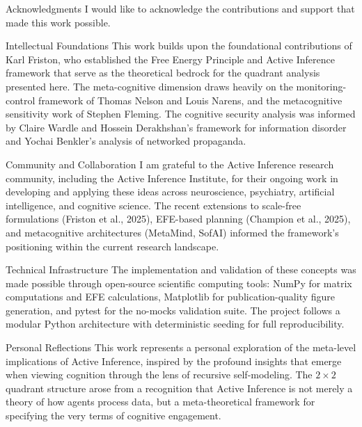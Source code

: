 \documentclass[
  ignorenonframetext,
]{beamer}
\author{\texorpdfstring{}{}}
\date{}
\begin{document}
\begin{frame}{Acknowledgments}
\protect{}\label{sec:acknowledgments}
I would like to acknowledge the contributions and support that made this
work possible.

\begin{block}{Intellectual Foundations}
\protect{}\label{intellectual-foundations}
This work builds upon the foundational contributions of Karl Friston,
who established the Free Energy Principle and Active Inference framework
that serve as the theoretical bedrock for the quadrant analysis
presented here. The meta-cognitive dimension draws heavily on the
monitoring-control framework of Thomas Nelson and Louis Narens, and the
metacognitive sensitivity work of Stephen Fleming. The cognitive
security analysis was informed by Claire Wardle and Hossein Derakhshan's
framework for information disorder and Yochai Benkler's analysis of
networked propaganda.
\end{block}

\begin{block}{Community and Collaboration}
\protect{}\label{community-and-collaboration}
I am grateful to the Active Inference research community, including the
Active Inference Institute, for their ongoing work in developing and
applying these ideas across neuroscience, psychiatry, artificial
intelligence, and cognitive science. The recent extensions to scale-free
formulations (Friston et al., 2025), EFE-based planning (Champion et
al., 2025), and metacognitive architectures (MetaMind, SofAI) informed
the framework's positioning within the current research landscape.
\end{block}

\begin{block}{Technical Infrastructure}
\protect{}\label{technical-infrastructure}
The implementation and validation of these concepts was made possible
through open-source scientific computing tools: NumPy for matrix
computations and EFE calculations, Matplotlib for publication-quality
figure generation, and pytest for the no-mocks validation suite. The
project follows a modular Python architecture with deterministic seeding
for full reproducibility.
\end{block}

\begin{block}{Personal Reflections}
\protect{}\label{personal-reflections}
This work represents a personal exploration of the meta-level
implications of Active Inference, inspired by the profound insights that
emerge when viewing cognition through the lens of recursive
self-modeling. The \(2 \times 2\) quadrant structure arose from a
recognition that Active Inference is not merely a theory of how agents
process data, but a meta-theoretical framework for specifying the very
terms of cognitive engagement.
\end{block}
\end{frame}
\end{document}
